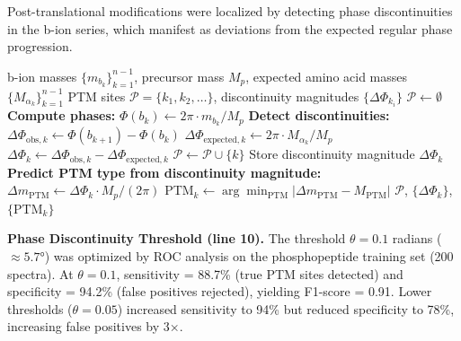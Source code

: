 \documentclass[11pt,twocolumn]{article}
\begin{document}
Post-translational modifications were localized by detecting phase discontinuities in the b-ion series, which manifest as deviations from the expected regular phase progression.

\begin{algorithm}[h]
\caption{PTM Localization via Phase Discontinuity Detection}
\label{alg:ptm}
\begin{algorithmic}[1]
\Require b-ion masses $\{m_{b_k}\}_{k=1}^{n-1}$, precursor mass $M_p$, expected amino acid masses $\{M_{\alpha_k}\}_{k=1}^{n-1}$
\Ensure PTM sites $\mathcal{P} = \{k_1, k_2, \ldots\}$, discontinuity magnitudes $\{\Delta\Phi_{k_i}\}$
\State $\mathcal{P} \gets \emptyset$
\State \textbf{Compute phases:}
    \State $\Phi(b_k) \gets 2\pi \cdot m_{b_k} / M_p$ 
\EndFor
\State \textbf{Detect discontinuities:}
    \State $\Delta\Phi_{\text{obs}, k} \gets \Phi(b_{k+1}) - \Phi(b_k)$ 
    \State $\Delta\Phi_{\text{expected}, k} \gets 2\pi \cdot M_{\alpha_k} / M_p$ 
    \State $\Delta\Phi_k \gets \Delta\Phi_{\text{obs}, k} - \Delta\Phi_{\text{expected}, k}$ 
     
        \State $\mathcal{P} \gets \mathcal{P} \cup \{k\}$ 
        \State Store discontinuity magnitude $\Delta\Phi_k$
    \EndIf
\EndFor
\State \textbf{Predict PTM type from discontinuity magnitude:}
    \State $\Delta m_{\text{PTM}} \gets \Delta\Phi_k \cdot M_p / (2\pi)$ 
    \State $\text{PTM}_k \gets \arg\min_{\text{PTM}} |\Delta m_{\text{PTM}} - M_{\text{PTM}}|$ 
\EndFor
\State \Return $\mathcal{P}$, $\{\Delta\Phi_k\}$, $\{\text{PTM}_k\}$
\end{algorithmic}
\end{algorithm}

\textbf{Phase Discontinuity Threshold (line 10).} The threshold $\theta = 0.1$ radians ($\approx 5.7°$) was optimized by ROC analysis on the phosphopeptide training set (200 spectra). At $\theta = 0.1$, sensitivity = 88.7\% (true PTM sites detected) and specificity = 94.2\% (false positives rejected), yielding F1-score = 0.91. Lower thresholds ($\theta = 0.05$) increased sensitivity to 94\% but reduced specificity to 78\%, increasing false positives by 3×.
\end{document}
